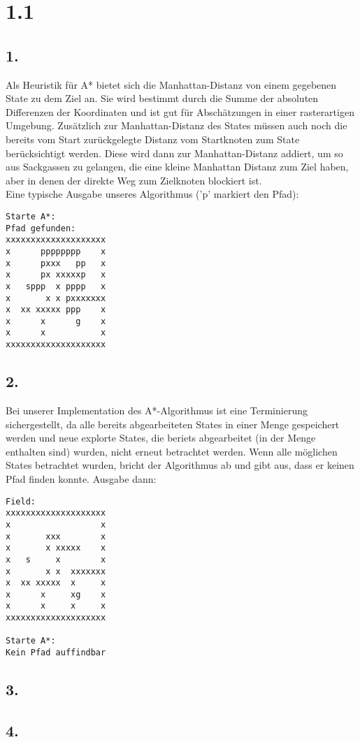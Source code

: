 \documentclass[a4paper,11pt,fleqn]{scrartcl}
\title{\titleinfo}
\author{\authorinfo}
\begin{document}
\maketitle

\section*{1.1}
\subsection*{1.}
Als Heuristik für A* bietet sich die Manhattan-Distanz von einem gegebenen State zu dem Ziel an. Sie wird bestimmt durch die Summe der absoluten Differenzen der Koordinaten und ist gut für Abschätzungen in einer rasterartigen Umgebung.
Zusätzlich zur Manhattan-Distanz des States müssen auch noch die bereits vom Start zurückgelegte Distanz vom Startknoten zum State berücksichtigt werden.
Diese wird dann zur Manhattan-Distanz addiert, um so aus Sackgassen zu gelangen, die eine kleine Manhattan Distanz zum Ziel haben, aber in denen der direkte Weg zum Zielknoten blockiert ist.\\
Eine typische Ausgabe unseres Algorithmus ('p' markiert den Pfad):\\
\begin{verbatim}
Starte A*:
Pfad gefunden:
xxxxxxxxxxxxxxxxxxxx
x      pppppppp    x
x      pxxx   pp   x
x      px xxxxxp   x
x   sppp  x pppp   x
x       x x pxxxxxxx
x  xx xxxxx ppp    x
x      x      g    x
x      x           x
xxxxxxxxxxxxxxxxxxxx
\end{verbatim}

\subsection*{2.}
Bei unserer Implementation des A*-Algorithmus ist eine Terminierung sichergestellt, da alle bereits abgearbeiteten States in einer Menge gespeichert werden und neue explorte States, die beriets 
abgearbeitet (in der Menge enthalten sind) wurden, nicht erneut betrachtet werden. Wenn alle möglichen States betrachtet wurden, bricht der Algorithmus ab und gibt aus, dass er keinen Pfad finden konnte.
Ausgabe dann:
\begin{verbatim}
Field:
xxxxxxxxxxxxxxxxxxxx
x                  x
x       xxx        x
x       x xxxxx    x
x   s     x        x
x       x x  xxxxxxx
x  xx xxxxx  x     x
x      x     xg    x
x      x     x     x
xxxxxxxxxxxxxxxxxxxx

Starte A*:
Kein Pfad auffindbar
\end{verbatim}

\subsection*{3.}

\subsection*{4.}
\end{document}

